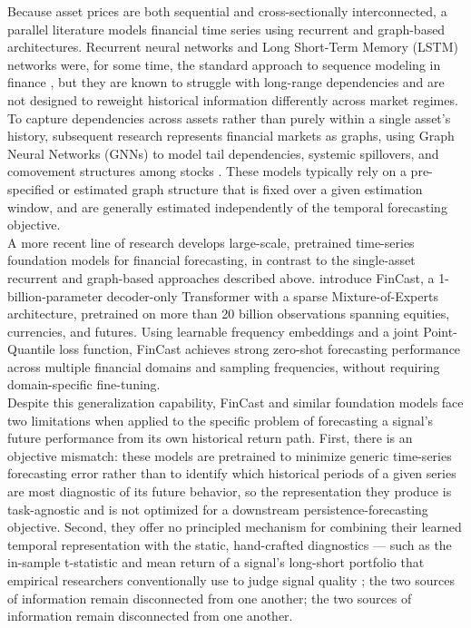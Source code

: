 \documentclass[pdflatex,sn-mathphys-num]{sn-jnl}%
\theoremstyle{thmstyleone}%
\theoremstyle{thmstyletwo}%
\theoremstyle{thmstylethree}%
\begin{document}
Because asset prices are both sequential and cross-sectionally interconnected, a parallel literature models financial time series using recurrent and graph-based architectures. Recurrent neural networks and Long Short-Term Memory (LSTM) networks were, for some time, the standard approach to sequence modeling in finance \cite{yu2020stock}, but they are known to struggle with long-range dependencies and are not designed to reweight historical information differently across market regimes. To capture dependencies across assets rather than purely within a single asset's history, subsequent research represents financial markets as graphs, using Graph Neural Networks (GNNs) to model tail dependencies, systemic spillovers, and comovement structures among stocks \cite{wu2020connecting, chen2018incorporating}. These models typically rely on a pre-specified or estimated graph structure that is fixed over a given estimation window, and are generally estimated independently of the temporal forecasting objective.\\

A more recent line of research develops large-scale, pretrained time-series foundation models for financial forecasting, in contrast to the single-asset recurrent and graph-based approaches described above. \citep{zhu2025fincast} introduce FinCast, a 1-billion-parameter decoder-only Transformer with a sparse Mixture-of-Experts architecture, pretrained on more than 20 billion observations spanning equities, currencies, and futures. Using learnable frequency embeddings and a joint Point-Quantile loss function, FinCast achieves strong zero-shot forecasting performance across multiple financial domains and sampling frequencies, without requiring domain-specific fine-tuning.\\

Despite this generalization capability, FinCast and similar foundation models face two limitations when applied to the specific problem of forecasting a signal's future performance from its own historical return path. First, there is an objective mismatch: these models are pretrained to minimize generic time-series forecasting error rather than to identify which historical periods of a given series are most diagnostic of its future behavior, so the representation they produce is task-agnostic and is not optimized for a downstream persistence-forecasting objective. Second, they offer no principled mechanism for combining their learned temporal representation with the static, hand-crafted diagnostics — such as the in-sample t-statistic and mean return of a signal's long-short portfolio that empirical researchers conventionally use to judge signal quality \cite{harvey2016and, chen2025t}; the two sources of information remain disconnected from one another; the two sources of information remain disconnected from one another.
\end{document}
